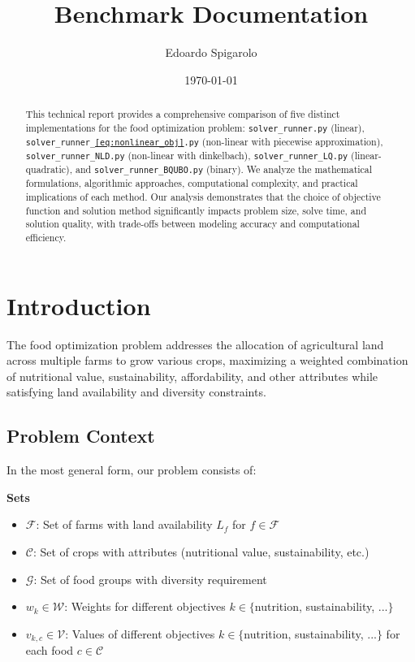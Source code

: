 \documentclass{article}
\title{Benchmark Documentation}
\author{Edoardo Spigarolo}
\date{\today}
\begin{document}
\maketitle

\tableofcontents
\newpage

\begin{abstract}
This technical report provides a comprehensive comparison of five distinct implementations for the food optimization problem: \texttt{solver\_runner.py} (linear), \texttt{solver\_runner\_\ref{eq:nonlinear_obj}.py} (non-linear with piecewise approximation), \texttt{solver\_runner\_NLD.py} (non-linear with dinkelbach), \texttt{solver\_runner\_LQ.py} (linear-quadratic), and \texttt{solver\_runner\_BQUBO.py} (binary).
We analyze the mathematical formulations, algorithmic approaches, computational complexity, and practical implications of each method. Our analysis demonstrates that the choice of objective function and solution method significantly impacts problem size, solve time, and solution quality, with trade-offs between modeling accuracy and computational efficiency.
\end{abstract}


\section{Introduction}

The food optimization problem addresses the allocation of agricultural land across multiple farms to grow various crops, maximizing a weighted combination of nutritional value, sustainability, affordability, and other attributes while satisfying land availability and diversity constraints.

\subsection{Problem Context}


In the most general form, our problem consists of:

\textbf{Sets}
\begin{itemize}
    \item $\mathcal{F}$: Set of farms with land availability $L_f$ for $f \in \mathcal{F}$
    \item $\mathcal{C}$: Set of crops with attributes (nutritional value, sustainability, etc.)
    \item $\mathcal{G}$: Set of food groups with diversity requirement
    \item $w_k \in \mathcal{W}$: Weights for different objectives $k \in \{$nutrition, sustainability, ...$\}$
    \item $v_{k,c} \in \mathcal{V}$: Values of different objectives $k \in \{$nutrition, sustainability, ...$\}$ for each food $c \in \mathcal{C}$ 
\end{itemize}
\end{document}
